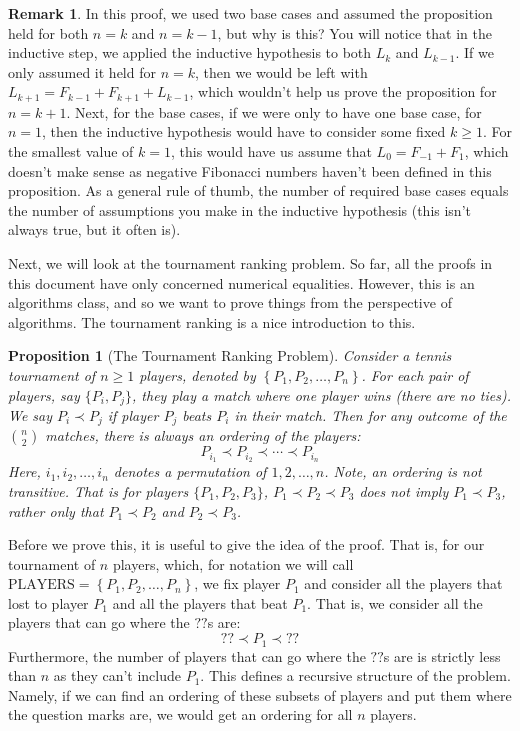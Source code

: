 \documentclass{article}
\theoremstyle{plain}
\newtheorem{proposition}{Proposition}
\theoremstyle{definition}
\newtheorem{remark}{Remark}
\begin{document}
\begin{remark}
    In this proof, we used two base cases and assumed the proposition held for both \(n=k\) and \(n=k-1\), but why is this? You will notice that in the inductive step, we applied the inductive hypothesis to both \(L_k\) and \(L_{k-1}\). If we only assumed it held for \(n=k\), then we would be left with \(L_{k+1} = F_{k-1} + F_{k+1} + L_{k-1}\), which wouldn't help us prove the proposition for \(n=k+1\). Next, for the base cases, if we were only to have one base case, for \(n=1\), then the inductive hypothesis would have to consider some fixed \(k \geq 1\). For the smallest value of \(k=1\), this would have us assume that \(L_0 = F_{-1} + F_{1}\), which doesn't make sense as negative Fibonacci numbers haven't been defined in this proposition. As a general rule of thumb, the number of required base cases equals the number of assumptions you make in the inductive hypothesis (this isn't always true, but it often is).
\end{remark}

\phantom{abc}

Next, we will look at the tournament ranking problem. So far, all the proofs in this document have only concerned numerical equalities. However, this is an algorithms class, and so we want to prove things from the perspective of algorithms. The tournament ranking is a nice introduction to this.

\begin{proposition}[The Tournament Ranking Problem]
    Consider a tennis tournament of \(n \geq 1\) players, denoted by \(\left\{P_1, P_2, \dotsc, P_n\right\}\). For each pair of players, say \(\{P_i, P_j\}\), they play a match where one player wins (there are no ties). We say \(P_i \prec P_j\) if player \(P_j\) beats \(P_i\) in their match. Then for any outcome of the \(\binom{n}{2}\) matches, there is always an ordering of the players:
    \[P_{i_1} \prec P_{i_2} \prec \cdots \prec P_{i_n}\]
    Here, \(i_1, i_2, \dotsc, i_n\) denotes a permutation of \(1, 2, \dotsc, n\). Note, an ordering is \emph{not} transitive. That is for players \(\{P_1, P_2, P_3\}\), \(P_1 \prec P_2 \prec P_3\) does \emph{not} imply \(P_1 \prec P_3\), rather only that \(P_1 \prec P_2\) and \(P_2 \prec P_3\).
\end{proposition}

Before we prove this, it is useful to give the idea of the proof. That is, for our tournament of \(n\) players, which, for notation we will call \(\text{PLAYERS} = \left\{P_1, P_2, \dotsc, P_n\right\}\), we fix player \(P_1\) and consider all the players that lost to player \(P_1\) and all the players that beat \(P_1\). That is, we consider all the players that can go where the \(??\)s are:
\[?? \prec P_1 \prec ??\]
Furthermore, the number of players that can go where the \(??\)s are is strictly less than \(n\) as they can't include \(P_1\). This defines a recursive structure of the problem. Namely, if we can find an ordering of these subsets of players and put them where the question marks are, we would get an ordering for all \(n\) players.
\end{document}
